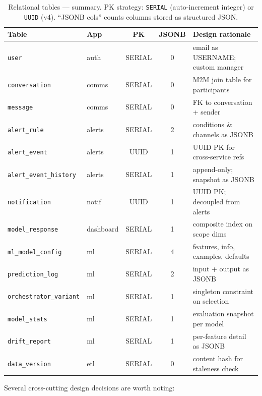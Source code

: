 \begin{table}[htbp]
\centering
\caption{Relational tables — summary.  PK strategy: \texttt{SERIAL}
         (auto-increment integer) or \texttt{UUID} (v4).  ``JSONB cols''
         counts columns stored as structured JSON.}
\label{tab:mld-summary}
\small
\begin{tabular}{@{}llccl@{}}
\toprule
\textbf{Table} & \textbf{App}
    & \textbf{PK} & \textbf{JSONB}
    & \textbf{Design rationale} \\
\midrule
\texttt{user}
    & auth & SERIAL & 0
    & email as USERNAME; custom manager \\
\texttt{conversation}
    & comms & SERIAL & 0
    & M2M join table for participants \\
\texttt{message}
    & comms & SERIAL & 0
    & FK to conversation + sender \\
\texttt{alert\_rule}
    & alerts & SERIAL & 2
    & conditions \& channels as JSONB \\
\texttt{alert\_event}
    & alerts & UUID & 1
    & UUID PK for cross-service refs \\
\texttt{alert\_event\_history}
    & alerts & SERIAL & 1
    & append-only; snapshot as JSONB \\
\texttt{notification}
    & notif & UUID & 1
    & UUID PK; decoupled from alerts \\
\texttt{model\_response}
    & dashboard & SERIAL & 1
    & composite index on scope dims \\
\texttt{ml\_model\_config}
    & ml & SERIAL & 4
    & features, info, examples, defaults \\
\texttt{prediction\_log}
    & ml & SERIAL & 2
    & input + output as JSONB \\
\texttt{orchestrator\_variant}
    & ml & SERIAL & 1
    & singleton constraint on selection \\
\texttt{model\_stats}
    & ml & SERIAL & 1
    & evaluation snapshot per model \\
\texttt{drift\_report}
    & ml & SERIAL & 1
    & per-feature detail as JSONB \\
\texttt{data\_version}
    & etl & SERIAL & 0
    & content hash for staleness check \\
\bottomrule
\end{tabular}
\end{table}

Several cross-cutting design decisions are worth noting:

